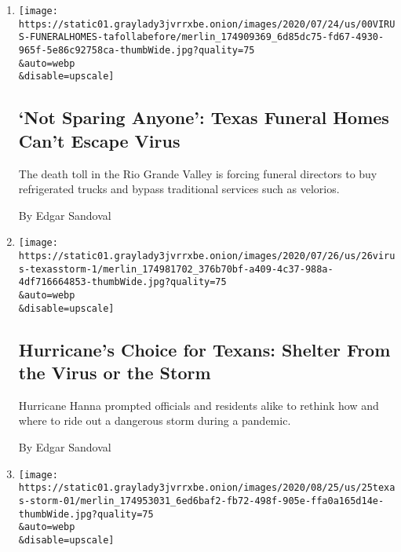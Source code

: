 \begin{enumerate}
\def\labelenumi{\arabic{enumi}.}
\item
  \href{/2020/07/28/us/coronavirus-texas-funeral-homes.html}{}

  \texttt{[image: https://static01.graylady3jvrrxbe.onion/images/2020/07/24/us/00VIRUS-FUNERALHOMES-tafollabefore/merlin\_174909369\_6d85dc75-fd67-4930-965f-5e86c92758ca-thumbWide.jpg?quality=75\\\&auto=webp\\\&disable=upscale]}

  \hypertarget{not-sparing-anyone-texas-funeral-homes-cant-escape-virus}{%
  \subsection{`Not Sparing Anyone': Texas Funeral Homes Can't Escape
  Virus}\label{not-sparing-anyone-texas-funeral-homes-cant-escape-virus}}

  The death toll in the Rio Grande Valley is forcing funeral directors
  to buy refrigerated trucks and bypass traditional services such as
  velorios.

  By Edgar Sandoval
\item
  \href{/2020/07/26/us/virus-texas-storm.html}{}

  \texttt{[image: https://static01.graylady3jvrrxbe.onion/images/2020/07/26/us/26virus-texasstorm-1/merlin\_174981702\_376b70bf-a409-4c37-988a-4df716664853-thumbWide.jpg?quality=75\\\&auto=webp\\\&disable=upscale]}

  \hypertarget{hurricanes-choice-for-texans-shelter-from-the-virus-or-the-storm}{%
  \subsection{Hurricane's Choice for Texans: Shelter From the Virus or
  the
  Storm}\label{hurricanes-choice-for-texans-shelter-from-the-virus-or-the-storm}}

  Hurricane Hanna prompted officials and residents alike to rethink how
  and where to ride out a dangerous storm during a pandemic.

  By Edgar Sandoval
\item
  \href{/2020/07/25/us/hanna-storm-texas.html}{}

  \texttt{[image: https://static01.graylady3jvrrxbe.onion/images/2020/08/25/us/25texas-storm-01/merlin\_174953031\_6ed6baf2-fb72-498f-905e-ffa0a165d14e-thumbWide.jpg?quality=75\\\&auto=webp\\\&disable=upscale]}

  \hypertarget{hurricane-hanna-hits-texas-region-struggling-with-coronavirus}{%
}
\end{enumerate}
